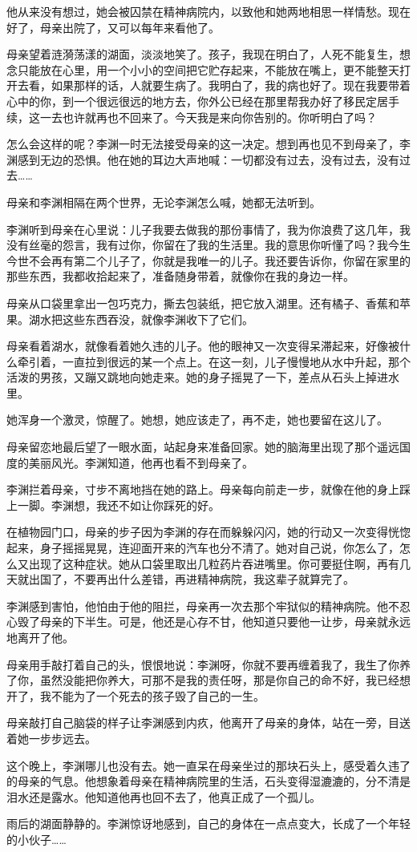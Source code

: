\documentclass[UTF8]{ctexart}
\begin{document}
他从来没有想过，她会被囚禁在精神病院内，以致他和她两地相思一样情愁。现在好了，母亲出院了，又可以每年来看他了。

母亲望着涟漪荡漾的湖面，淡淡地笑了。孩子，我现在明白了，人死不能复生，想念只能放在心里，用一个小小的空间把它贮存起来，不能放在嘴上，更不能整天打开去看，如果那样的话，人就要生病了。我明白了，我的病也好了。现在我要带着心中的你，到一个很远很远的地方去，你外公已经在那里帮我办好了移民定居手续，这一去也许就再也不回来了。今天我是来向你告别的。你听明白了吗？

怎么会这样的呢？李渊一时无法接受母亲的这一决定。想到再也见不到母亲了，李渊感到无边的恐惧。他在她的耳边大声地喊：一切都没有过去，没有过去，没有过去\ldots\ldots{}

母亲和李渊相隔在两个世界，无论李渊怎么喊，她都无法听到。

李渊听到母亲在心里说：儿子我要去做我的那份事情了，我为你浪费了这几年，我没有丝毫的怨言，我有过你，你留在了我的生活里。我的意思你听懂了吗？我今生今世不会再有第二个儿子了，你就是我唯一的儿子。我还要告诉你，你留在家里的那些东西，我都收拾起来了，准备随身带着，就像你在我的身边一样。

母亲从口袋里拿出一包巧克力，撕去包装纸，把它放入湖里。还有橘子、香蕉和苹果。湖水把这些东西吞没，就像李渊收下了它们。

母亲看着湖水，就像看着她久违的儿子。他的眼神又一次变得呆滞起来，好像被什么牵引着，一直拉到很远的某一个点上。在这一刻，儿子慢慢地从水中升起，那个活泼的男孩，又蹦又跳地向她走来。她的身子摇晃了一下，差点从石头上掉进水里。

她浑身一个激灵，惊醒了。她想，她应该走了，再不走，她也要留在这儿了。

母亲留恋地最后望了一眼水面，站起身来准备回家。她的脑海里出现了那个遥远国度的美丽风光。李渊知道，他再也看不到母亲了。

李渊拦着母亲，寸步不离地挡在她的路上。母亲每向前走一步，就像在他的身上踩上一脚。李渊想，我还不如让你踩死的好。

在植物园门口，母亲的步子因为李渊的存在而躲躲闪闪，她的行动又一次变得恍惚起来，身子摇摇晃晃，连迎面开来的汽车也分不清了。她对自己说，你怎么了，怎么又出现了这种症状。她从口袋里取出几粒药片吞进嘴里。你可要挺住啊，再有几天就出国了，不要再出什么差错，再进精神病院，我这辈子就算完了。

李渊感到害怕，他怕由于他的阻拦，母亲再一次去那个牢狱似的精神病院。他不忍心毁了母亲的下半生。可是，他还是心存不甘，他知道只要他一让步，母亲就永远地离开了他。

母亲用手敲打着自己的头，恨恨地说：李渊呀，你就不要再缠着我了，我生了你养了你，虽然没能把你养大，可那不是我的责任呀，那是你自己的命不好，我已经想开了，我不能为了一个死去的孩子毁了自己的一生。

母亲敲打自己脑袋的样子让李渊感到内疚，他离开了母亲的身体，站在一旁，目送着她一步步远去。

这个晚上，李渊哪儿也没有去。她一直呆在母亲坐过的那块石头上，感受着久违了的母亲的气息。他想象着母亲在精神病院里的生活，石头变得湿漉漉的，分不清是泪水还是露水。他知道他再也回不去了，他真正成了一个孤儿。

雨后的湖面静静的。李渊惊讶地感到，自己的身体在一点点变大，长成了一个年轻的小伙子\ldots\ldots{}
\end{document}
